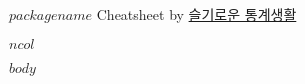 \documentclass[10pt,quotespacing]{oblivoir}
\begin{document}
\textbf{$packagename$} Cheatsheet by \href{https://www.youtube.com/c/statisticsplaybook}{슬기로운 통계생활}

\begin{multicols*}{$ncol$}

\setlength{\premulticols}{0.25pt}
\setlength{\postmulticols}{0.25pt}
\setlength{\multicolsep}{0.25pt}
\setlength{\columnsep}{0.25pt}

\tiny

$body$

\end{multicols*}
\end{document}
